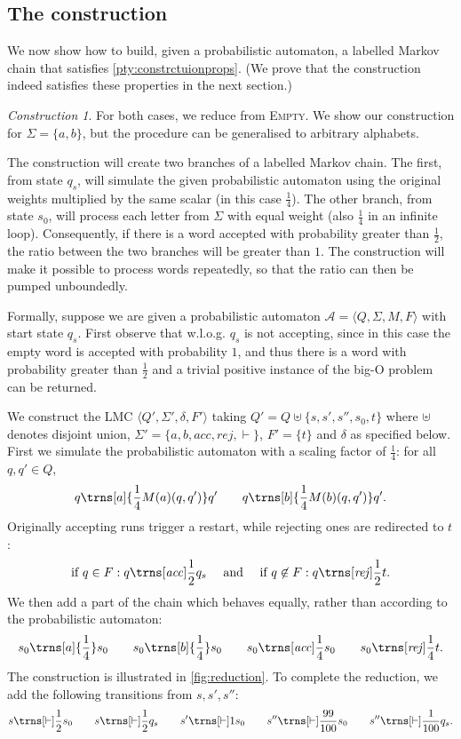 \documentclass[10pt,a4paper]{amsart}
\numberwithin{equation}{section}
\theoremstyle{plain}
\theoremstyle{definition}
\theoremstyle{remark}
\newtheorem{construction}[thm]{Construction}
\newcommand\acc{\mathit{acc}}
\newcommand\rej{\mathit{rej}}
\newcommand\abra[1]{\langle #1 \rangle}
\newcommand\pa{\mathcal{A}}
\begin{document}
\subsection{The construction}
\label{sec:undeci:construction}
We now show how to build, given a probabilistic automaton, a labelled Markov chain that satisfies \cref{pty:constrctuionprops}. (We prove that the construction indeed satisfies these properties in the next section.)
\begin{construction}\label{construction:undec} For both cases, we reduce from \textsc{Empty}.
We show our construction for $\Sigma{} = \{a,b\}$, but the procedure can be generalised to arbitrary alphabets.

The construction will create two branches of a labelled Markov chain.
The first, from state $q_s$, will simulate the given probabilistic automaton using the original weights multiplied by the same scalar (in this case $\frac{1}{4}$).
The other branch, from state $s_0$, will process each letter from $\Sigma$ with equal weight (also $\frac{1}{4}$ in an infinite loop). Consequently,
 if there is a word accepted with probability greater than $\frac{1}{2}$, the ratio between the two branches will be greater than $1$.
 The construction will make it possible to process words repeatedly, so that the ratio can then be pumped unboundedly.

Formally, suppose we are given a probabilistic automaton $\pa = \abra{Q,\Sigma, M,F}$ with start state $q_s$. First observe that w.l.o.g. $q_s$ is not accepting, since in this case the empty word is accepted with probability $1$, and thus there is a word with probability greater than $\frac{1}{2}$ and a trivial positive instance of the big-O problem can be returned.

We construct the LMC
$\abra{Q',\Sigma', \delta, F'}$ taking $Q' =Q \uplus \{s, s', s'', s_0, t\}$ where $\uplus$ denotes disjoint union, $\Sigma' = \{a,b,\acc,\rej, {\vdash}\}$, $F' = \{t\}$ and $\delta$ as specified below.
First we simulate the probabilistic automaton with a scaling factor of $\frac{1}{4}$: for all $q,q'\in Q$,
\[
  q\trns[a]{\frac{1}{4}M(a)(q,q')} q' \quad  \quad  q\trns[b]{\frac{1}{4}M(b)(q,q')} q'.
\]
Originally accepting runs trigger a restart, while rejecting ones are  redirected to $t$:
\[
\text{if }q \in F: q\trns[\acc]{\frac{1}{2}} q_s \quad \text{ and }  \quad \text{if } q \not\in F: q\trns[\rej]{\frac{1}{2}} t.
\]
We then add a part of the chain which behaves equally, rather than according to the probabilistic automaton:
\[
 s_0\trns[a]{\frac{1}{4}} s_0 \quad\quad s_0\trns[b]{\frac{1}{4}} s_0 \quad\quad s_0\trns[\acc]{\frac{1}{4}} s_0  \quad\quad s_0\trns[\rej]{\frac{1}{4}} t.
\]
The construction is illustrated in \cref{fig:reduction}. To complete the reduction, we add the following transitions from $s,s',s''$:
  \[ s \trns[{\vdash}]{\frac{1}{2}} s_0 \quad\quad  s \trns[{\vdash}]{\frac{1}{2}} q_s
 \quad\quad   s' \trns[{\vdash}]{1} s_0
 \quad\quad   s'' \trns[{\vdash}]{\frac{99}{100}} s_0 \quad\quad s'' \trns[{\vdash}]{\frac{1}{100}} q_s.
\]


\end{construction}
\end{document}
